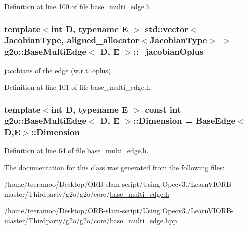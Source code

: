 Definition at line 100 of file base\+\_\+multi\+\_\+edge.\+h.

\subsubsection[{\texorpdfstring{\+\_\+jacobian\+Oplus}{_jacobianOplus}}]{\setlength{\rightskip}{0pt plus 5cm}template$<$int D, typename E $>$ std\+::vector$<${\bf Jacobian\+Type}, aligned\+\_\+allocator$<${\bf Jacobian\+Type}$>$ $>$ {\bf g2o\+::\+Base\+Multi\+Edge}$<$ D, E $>$\+::\+\_\+jacobian\+Oplus\hspace{0.3cm}{\ttfamily [protected]}}\hypertarget{classg2o_1_1BaseMultiEdge_a00f8130e287bc945a8436375c4d07a02}{}\label{classg2o_1_1BaseMultiEdge_a00f8130e287bc945a8436375c4d07a02}


jacobians of the edge (w.\+r.\+t. oplus) 



Definition at line 101 of file base\+\_\+multi\+\_\+edge.\+h.

\subsubsection[{\texorpdfstring{Dimension}{Dimension}}]{\setlength{\rightskip}{0pt plus 5cm}template$<$int D, typename E $>$ const int {\bf g2o\+::\+Base\+Multi\+Edge}$<$ D, E $>$\+::Dimension = {\bf Base\+Edge}$<$D,E$>$\+::Dimension\hspace{0.3cm}{\ttfamily [static]}}\hypertarget{classg2o_1_1BaseMultiEdge_a3c713fe8d1cd161f777625d8e2d5695d}{}\label{classg2o_1_1BaseMultiEdge_a3c713fe8d1cd161f777625d8e2d5695d}


Definition at line 64 of file base\+\_\+multi\+\_\+edge.\+h.



The documentation for this class was generated from the following files\+:\begin{DoxyCompactItemize}
\item 
/home/teeramoo/\+Desktop/\+O\+R\+B-\/slam-\/script/\+Using Opecv3./\+Learn\+V\+I\+O\+R\+B-\/master/\+Thirdparty/g2o/g2o/core/\hyperlink{base__multi__edge_8h}{base\+\_\+multi\+\_\+edge.\+h}\item 
/home/teeramoo/\+Desktop/\+O\+R\+B-\/slam-\/script/\+Using Opecv3./\+Learn\+V\+I\+O\+R\+B-\/master/\+Thirdparty/g2o/g2o/core/\hyperlink{base__multi__edge_8hpp}{base\+\_\+multi\+\_\+edge.\+hpp}\end{DoxyCompactItemize}
